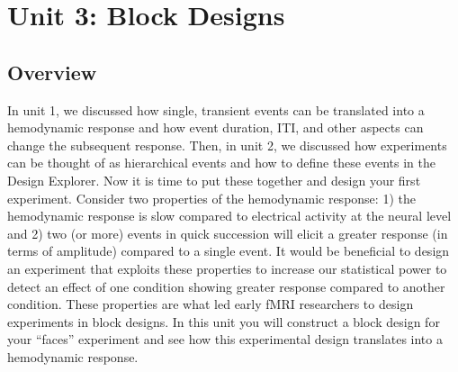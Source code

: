 \documentclass[10pt]{article}
\begin{document}

\section{Unit 3: Block Designs}
\label{sec:unit3}
	\subsection{Overview}
	\label{subsec:u3overview}
		In unit 1, we discussed how single, transient events can be translated into a hemodynamic response and how event duration, ITI, and other aspects can change the subsequent response.
		Then, in unit 2, we discussed how experiments can be thought of as hierarchical events and how to define these events in the Design Explorer.
		Now it is time to put these together and design your first experiment.
		Consider two properties of the hemodynamic response: 1) the hemodynamic response is slow compared to electrical activity at the neural level and 2) two (or more) events in quick succession will elicit a greater response (in terms of amplitude) compared to a single event.
		It would be beneficial to design an experiment that exploits these properties to increase our statistical power to detect an effect of one condition showing greater response compared to another condition. 
		These properties are what led early fMRI researchers to design experiments in block designs.
		In this unit you will construct a block design for your ``faces'' experiment and see how this experimental design translates into a hemodynamic response.
\end{document}
